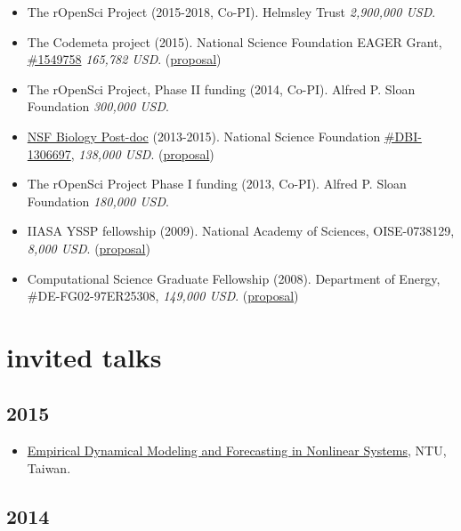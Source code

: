 \documentclass[10pt,sans]{moderncv}        %
\providecommand{\tightlist}{%
    \setlength{\itemsep}{0pt}\setlength{\parskip}{0pt}}
\begin{document}
\begin{itemize}
\item
  The rOpenSci Project (2015-2018, Co-PI). Helmsley Trust
  \emph{2,900,000 USD}.
\item
  The Codemeta project (2015). National Science Foundation EAGER Grant,
  \href{https://www.nsf.gov/awardsearch/showAward?AWD_ID=1549758}{\#1549758}
  \emph{165,782 USD}.
  (\href{https://dx.doi.org/10.6084/m9.figshare.2055972}{proposal})
\item
  The rOpenSci Project, Phase II funding (2014, Co-PI). Alfred P. Sloan
  Foundation \emph{300,000 USD}.
\item
  \href{http://www.nsf.gov/pubs/2012/nsf12497/nsf12497.htm}{NSF Biology
  Post-doc} (2013-2015). National Science Foundation
  \href{http://www.nsf.gov/awardsearch/showAward?AWD_ID=1306697}{\#DBI-1306697},
  \emph{138,000 USD}.
  (\href{http://doi.org/10.6084/m9.figshare.652970}{proposal})
\item
  The rOpenSci Project Phase I funding (2013, Co-PI). Alfred P. Sloan
  Foundation \emph{180,000 USD}.
\item
  IIASA YSSP fellowship (2009). National Academy of Sciences,
  OISE-0738129, \emph{8,000 USD}.
  (\href{http://doi.org/10.6084/m9.figshare.678310}{proposal})
\item
  Computational Science Graduate Fellowship (2008). Department of
  Energy, \#DE-FG02-97ER25308, \emph{149,000 USD}.
  (\href{https://dx.doi.org/10.6084/m9.figshare.2010246}{proposal})
\end{itemize}

\section{invited talks}\label{invited-talks}

\subsection{2015}\label{section}

\begin{itemize}
\tightlist
\item
  \href{http://ecows.oc.ntu.edu.tw/itnlws/}{Empirical Dynamical Modeling
  and Forecasting in Nonlinear Systems}, NTU, Taiwan.
\end{itemize}

\subsection{2014}\label{section-1}
\end{document}
